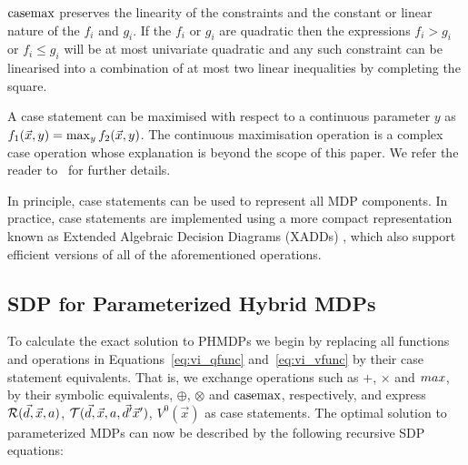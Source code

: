 $\mathrm{casemax}$ preserves the linearity of the constraints and the constant or linear nature of the {\footnotesize$f_i$} and {\footnotesize$g_i$}. If the {\footnotesize$f_i$} or {\footnotesize$g_i$} are quadratic then the expressions {\footnotesize$f_i > g_i$} or {\footnotesize$f_i \leq g_i$} will be at most univariate quadratic and any such constraint can be linearised into a combination of at most two linear inequalities by completing the square. 

A case statement can be maximised with respect to a continuous parameter {\footnotesize$y$} as {\footnotesize $ f_1(\vec{x}, y) = \contmax_{y}f_2(\vec{x}, y) $}. The continuous maximisation operation is a complex case operation whose explanation is beyond the scope of this paper. We refer the reader to~\parencite{Zamani_AAAI_2012} for further details.

In principle, case statements can be used to represent all MDP components. In practice, case statements are implemented using a more compact representation known as Extended Algebraic Decision Diagrams (XADDs) \parencite{Sanner_UAI_2011}, which also support efficient versions of all of the aforementioned operations.

\subsection{SDP for Parameterized Hybrid MDPs}

To calculate the exact solution to PHMDPs we begin by replacing all functions and operations in Equations~\eqref{eq:vi_qfunc} and~\eqref{eq:vi_vfunc} by their case statement equivalents. That is, we exchange operations such as {\footnotesize$+$}, {\footnotesize$\times$} and {\footnotesize$\mathnormal{max}$}, by their symbolic equivalents, {\footnotesize$\oplus$}, {\footnotesize$\otimes$} and $\mathrm{casemax}$, respectively, and express {\footnotesize $\mathcal{R}(\vec{d}, \vec{x}, a)$},  {\footnotesize $\mathcal{T}(\vec{d}, \vec{x}, a, \vec{d}' \vec{x}')$}, {\footnotesize $V^0(\vec{x})$} as case statements. The optimal solution to parameterized MDPs can now be described by the following recursive SDP equations:

